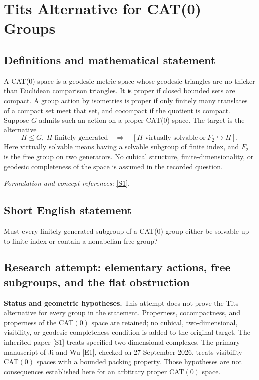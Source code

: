 \documentclass[11pt]{article}
\begin{document}
\section*{\texorpdfstring{Tits Alternative for CAT(0) Groups}{Tits Alternative for CAT(0) Groups}}\label{30006853}
\subsection{Definitions and mathematical statement}
A CAT(0) space is a geodesic metric space whose geodesic triangles are no thicker than Euclidean comparison triangles. It is proper if closed bounded sets are compact. A group action by isometries is proper if only finitely many translates of a compact set meet that set, and cocompact if the quotient is compact. Suppose $G$ admits such an action on a proper CAT(0) space. The target is the alternative
\[
 H\le G,\ H\text{ finitely generated}
 \quad\Longrightarrow\quad
 [H\text{ virtually solvable}\ \text{or}\ F_2\hookrightarrow H].
\]
Here virtually solvable means having a solvable subgroup of finite index, and $F_2$ is the free group on two generators. No cubical structure, finite-dimensionality, or geodesic completeness of the space is assumed in the recorded question.
\par\smallskip\textit{Formulation and concept references:} \href{https://www.cambridge.org/core/journals/forum-of-mathematics-pi/article/tits-alternative-for-2dimensional-mathrm-cat0-complexes/E1B5B96E5D4324F2F3707B4A05B2D86C}{[S1]}.

\subsection{Short English statement}
Must every finitely generated subgroup of a CAT(0) group either be solvable up to finite index or contain a nonabelian free group?
\subsection{Research attempt: elementary actions, free subgroups, and the flat obstruction}
\textbf{Status and geometric hypotheses.} This attempt does not prove the Tits alternative for every group in the statement. Properness, cocompactness, and properness of the CAT$(0)$ space are retained; no cubical, two-dimensional, visibility, or geodesic-completeness condition is added to the original target. The inherited paper [S1] treats specified two-dimensional complexes. The primary manuscript of Ji and Wu [E1], checked on 27 September 2026, treats visibility CAT$(0)$ spaces with a bounded packing property. Those hypotheses are not consequences established here for an arbitrary proper CAT$(0)$ space.
\end{document}
